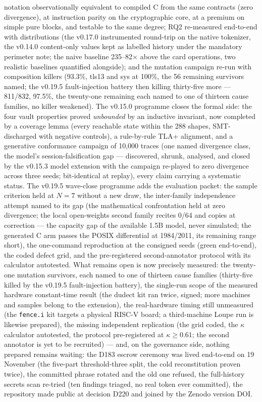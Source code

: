 \documentclass[11pt,a4paper]{article}
\newcommand{\code}[1]{\texttt{\small #1}}
\begin{document}
notation observationally equivalent to compiled C from the same contracts
(zero divergence), at instruction parity on the cryptographic core, at a
premium on simple pure blocks, and testable to the same degree; RQ2
re-measured end-to-end with distributions (the v0.17.0 instrumented
round-trip on the native tokenizer, the v0.14.0 content-only values
kept as labelled history under the mandatory perimeter note; the naive
baseline 235--82$\times$ above the card operations, two realistic
baselines quantified alongside); and the mutation campaign re-run with
composition killers (93.3\%, tls13 and sys at 100\%, the 56 remaining
survivors named; the v0.19.5 fault-injection battery then killing
thirty-five more --- 811/832, 97.5\%, the twenty-one remaining each
named to one of thirteen cause families, no killer weakened). The
v0.15.0 programme closes the formal side: the four vault
properties proved \emph{unbounded} by an inductive invariant, now
completed by a coverage lemma (every reachable state within the 288
shapes, SMT-discharged with negative controls), a rule-by-rule TLA+
alignment, and a generative conformance campaign of 10{,}000 traces
(one named divergence class, the model's session-falsification gap ---
discovered, shrunk, analysed, and closed by the v0.15.3 model
extension with the campaign re-played to zero divergence across three
seeds; bit-identical at replay), every claim carrying a systematic
status. The v0.19.5 wave-close programme adds the evaluation packet:
the sample criterion held at $N{=}7$ without a new draw, the
inter-family independence attempt named to its gap (the mathematical
confrontation held at zero divergence; the local open-weights second
family recites 0/64 and copies at correction --- the capacity gap of
the available 1.5B model, never simulated; the generated C arm passes
the POSIX differential at 1984/2011, its remaining range short), the
one-command reproduction at the consigned seeds (green end-to-end),
the coded defect grid, and the pre-registered second-annotator
protocol with its calculator autotested. What remains open
is now precisely measured: the twenty-one mutation survivors, each
named to one of thirteen cause families (thirty-five killed by the
v0.19.5 fault-injection battery), the single-run scope of the measured hardware constant-time
result (the dudect kit ran twice, signed; more machines and samples
belong to the extension), the real-hardware
timing still unmeasured (the \code{fence.i} kit targets a physical RISC-V
board; a third-machine Loupe run is likewise prepared), the missing
independent replication
(the grid coded, the $\kappa$ calculator autotested, the protocol
pre-registered at $\kappa\ge0.61$; the second annotator is yet to be
recruited) --- and, on the governance side, nothing prepared remains
waiting: the D183 escrow ceremony was lived end-to-end on 19 November
(the five-part threshold-three split, the cold reconstitution proven
twice), the committed phrase rotated and the old one refused, the
full-history secrets scan re-tried (ten findings triaged, no real
token ever committed), the repository made public at decision D220 and
joined by the Zenodo version DOI.
\end{document}
